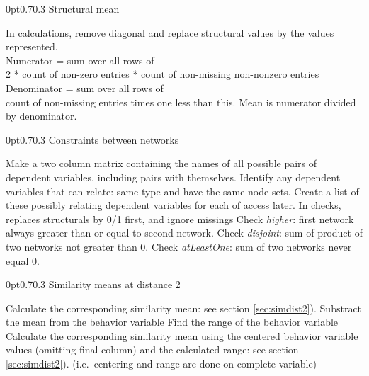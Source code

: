 \documentclass[12pt,a4paper]{article}
\makeatletter
\renewcommand{\=}{\,=\,}
\newcommand{\+}{\,+\,}
\renewcommand{\subsection}{\@startsection{subsection}{2}
                {0pt}{0.7\baselineskip}{0.3\baselineskip}
                {\sffamily} }
\makeatother
\begin{document}
\subsection{Structural  mean}
\label{sec:structmean}
\begin{algorithmic}
\STATE In calculations, remove diagonal and replace structural values by the
values represented.\\
\STATE Numerator = sum over all rows of\\
2 * count of non-zero entries * count of non-missing non-nonzero entries\\
\STATE Denominator = sum over all rows of \\
count of non-missing entries times one less than this.
\STATE Mean is numerator divided by denominator.
\end{algorithmic}
\subsection{Constraints between networks}
\label{sec:constraints}
\begin{algorithmic}
\STATE Make a two column matrix containing the names of all possible pairs of
dependent variables, including pairs with themselves.
\STATE Identify any dependent variables that can relate: same type and have the
same node sets.
\STATE Create a list of these possibly relating dependent variables for each of
access later.
\STATE In checks, replaces structurals by 0/1 first, and ignore missings
\STATE Check \emph{higher}: first network always greater than or equal to second
network.
\STATE Check \emph{disjoint}: sum of product of two networks not greater than 0.
\STATE Check \emph{atLeastOne}: sum of two networks never equal 0.
\ENDIF
\ENDFOR
\end{algorithmic}
\subsection{Similarity means at distance 2}
\label{sec:covarDist2}
\begin{algorithmic}
\STATE Calculate the corresponding similarity mean: see section
\ref{sec:simdist2}).
\ENDFOR
\ENDFOR
{}
\STATE Substract the mean from the behavior variable
\STATE Find the range of the behavior variable
\STATE Calculate the corresponding similarity mean using the centered behavior
variable values (omitting final column) and the calculated range: see section
\ref{sec:simdist2}).
(i.e.\ centering and range are done on complete variable)
\ENDFOR
\ENDFOR
\end{algorithmic}
\end{document}

